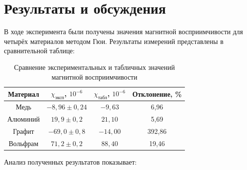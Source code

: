 \documentclass[a4paper]{article}
\begin{document}
\section{Результаты и обсуждения}

В ходе эксперимента были получены значения магнитной восприимчивости для четырёх материалов методом Гюи. Результаты измерений представлены в сравнительной таблице:

\begin{table}[h!]
    \centering
    \begin{tabular}{|c|c|c|c|}
        \hline
        Материал & $\chi_{\text{эксп}}$, $10^{-6}$ & $\chi_{\text{табл}}$\footnotemark[1], $10^{-6}$ & Отклонение, \% \\ \hline
        Медь & $-8,96 \pm 0,24$ & $-9,63$ & 6,96 \\ \hline
        Алюминий & $19,9 \pm 0,2$ & $21,10$ & 5,69 \\ \hline
        Графит & $-69,0 \pm 0,8$ & $-14,00$ & 392,86 \\ \hline
        Вольфрам & $71,2 \pm 0,2$ & $88,40$ & 19,46 \\ \hline
    \end{tabular}
    \caption{Сравнение экспериментальных и табличных значений магнитной восприимчивости}
    \label{tab:comparison}
\end{table}

Анализ полученных результатов показывает:
\end{document}
